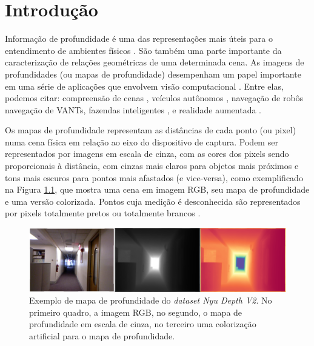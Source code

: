 
\chapter{Introdução}

Informação de profundidade é uma das representações mais úteis para o entendimento de ambientes físicos \cite{lasinger2019towards} \cite{zhou2019does}. São também uma parte importante da caracterização de relações geométricas de uma determinada cena. As imagens de profundidades (ou mapas de profundidade) desempenham um papel importante em uma série de aplicações que envolvem visão computacional \cite{eigen2014depth}.  Entre elas, podemos citar: compreensão de cenas \cite{jaritz2018sparse}, veículos autônomos \cite{song2021self}, navegação de robôs \cite{ma2019sparse} navegação de VANTs, \cite{padhy2023monocular} fazendas inteligentes \cite{farkhani2019sparse}, e realidade aumentada \cite{du2020depthlab}. 


Os mapas de profundidade representam as distâncias de cada ponto (ou pixel) numa cena física em relação ao eixo do dispositivo de captura. Podem ser representados por imagens em escala de cinza, com as cores dos pixels sendo proporcionais à distância, com cinzas mais claros para objetos mais próximos e tons mais escuros para pontos mais afastados (e vice-versa), como exemplificado na Figura \ref{dmap}, que mostra uma cena em imagem RGB, seu mapa de profundidade e uma versão colorizada. Pontos cuja medição é desconhecida são representados por pixels totalmente pretos ou totalmente brancos \cite{dourado2020multi}.

\begin{figure}[h]
    \centering
    \includegraphics[width=\textwidth]{fig/example_depth.png}
    \caption{Exemplo de mapa de profundidade do \textit{dataset Nyu Depth V2}. No primeiro quadro, a imagem RGB, no segundo, o mapa de profundidade em escala de cinza, no terceiro uma colorização artificial para o mapa de profundidade.}
    \label{dmap}
\end{figure}


